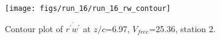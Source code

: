 \begin{figure}[H]
\centering
\texttt{[image: figs/run\_16/run\_16\_rw\_contour]}
\caption{Contour plot of $\overline{r^\prime w^\prime}$ at $z/c$=6.97, $V_{free}$=25.36, station 2.}
\label{fig:run_16_rw_contour}
\end{figure}


